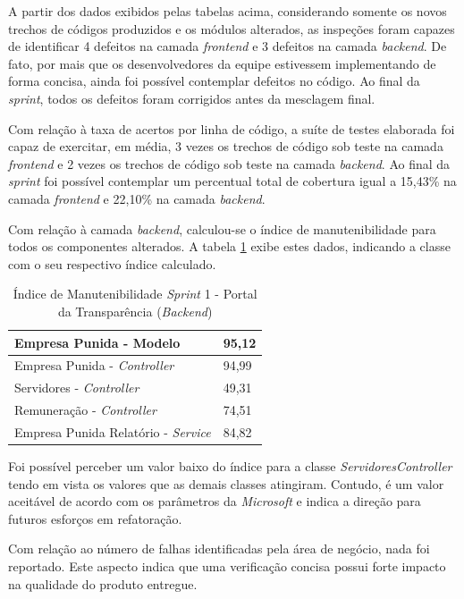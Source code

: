 A partir dos dados exibidos pelas tabelas acima, considerando somente os novos trechos de códigos produzidos e os módulos alterados, as inspeções foram capazes de identificar 4 defeitos na camada \textit{frontend} e 3 defeitos na camada \textit{backend}. De fato, por mais que os desenvolvedores da equipe estivessem implementando de forma concisa, ainda foi possível contemplar defeitos no código. Ao final da \textit{sprint}, todos os defeitos foram corrigidos antes da mesclagem final.

Com relação à taxa de acertos por linha de código, a suíte de testes elaborada foi capaz de exercitar, em média, 3 vezes os trechos de código sob teste na camada \textit{frontend} e 2 vezes os trechos de código sob teste na camada \textit{backend}. Ao final da \textit{sprint} foi possível contemplar um percentual total de cobertura igual a 15,43\% na camada \textit{frontend} e 22,10\% na camada \textit{backend}.

Com relação à camada \textit{backend}, calculou-se o índice de manutenibilidade para todos os componentes alterados. A tabela \ref{table:tabela4} exibe estes dados, indicando a classe com o seu respectivo índice calculado.

\begin{table}[h]
\caption{Índice de Manutenibilidade \textit{Sprint} 1 - Portal da Transparência (\textit{Backend})}
\centering
\begin{tabular}{ | m{10cm} | m{6cm} | } 
\hline
Empresa Punida - Modelo & 95,12 \\ 
\hline
Empresa Punida - \textit{Controller} & 94,99 \\ 
\hline
Servidores - \textit{Controller} & 49,31 \\ 
\hline
Remuneração - \textit{Controller} & 74,51 \\ 
\hline
Empresa Punida Relatório - \textit{Service} & 84,82 \\
\hline
\end{tabular}
\label{table:tabela4}
\end{table}

Foi possível perceber um valor baixo do índice para a classe \textit{ServidoresController} tendo em vista os valores que as demais classes atingiram. Contudo, é um valor aceitável de acordo com os parâmetros da \textit{Microsoft} e indica a direção para futuros esforços em refatoração.

Com relação ao número de falhas identificadas pela área de negócio, nada foi reportado. Este aspecto indica que uma verificação concisa possui forte impacto na qualidade do produto entregue.

